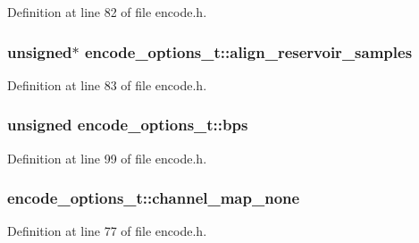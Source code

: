 Definition at line 82 of file encode.\+h.

\subsubsection[{\texorpdfstring{align\+\_\+reservoir\+\_\+samples}{align_reservoir_samples}}]{\setlength{\rightskip}{0pt plus 5cm}unsigned$\ast$ encode\+\_\+options\+\_\+t\+::align\+\_\+reservoir\+\_\+samples}\hypertarget{structencode__options__t_aeab408796c7f402e721fcad7c277574b}{}\label{structencode__options__t_aeab408796c7f402e721fcad7c277574b}


Definition at line 83 of file encode.\+h.

\subsubsection[{\texorpdfstring{bps}{bps}}]{\setlength{\rightskip}{0pt plus 5cm}unsigned encode\+\_\+options\+\_\+t\+::bps}\hypertarget{structencode__options__t_a32f678f30d82a28fbfe1069c03856dc8}{}\label{structencode__options__t_a32f678f30d82a28fbfe1069c03856dc8}


Definition at line 99 of file encode.\+h.

\subsubsection[{\texorpdfstring{channel\+\_\+map\+\_\+none}{channel_map_none}}]{ encode\+\_\+options\+\_\+t\+::channel\+\_\+map\+\_\+none}\hypertarget{structencode__options__t_ac2e8a7f51963de11ec0cc2c17c3534ff}{}\label{structencode__options__t_ac2e8a7f51963de11ec0cc2c17c3534ff}


Definition at line 77 of file encode.\+h.

